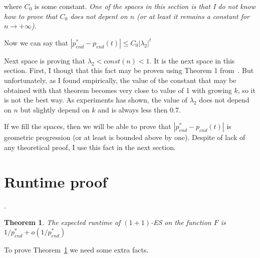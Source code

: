 \documentclass{article}
\newtheorem{theorem}{Theorem}
\begin{document}
where $C_0$ is some constant. \textit{One of the spaces in this section is that I do not know how to prove that $C_0$ does not depent on $n$ (or at least it remains a constant for $n \to +\infty$).}

Now we can say that $|p_{end}^* - p_{end}(t)| \le C_0 |\lambda_2|^t$

Next space is proving that $\lambda_2 < const(n) < 1.$ It is the next space in this section. First, I thougt that this fact may be proven using Theorem 1 from~\cite{secondev}. But unfortunately, as I found empirically, the value of the constant that may be obtained with that theorem becomes very close to value of 1 with growing $k$, so it is not the best way. As experiments has shown, the value of $\lambda_2$ does not depend on $n$ but slightly depend on $k$ and is always less then $0.7$.

If we fill the spaces, then we will be able to prove that  $|p_{end}^* - p_{end}(t)|$ is geometric progression (or at least is bounded above by one). Despite of lack of any theoretical proof, I use this fact in the next section.

\section{Runtime proof}.

\begin{theorem}\label{runtime_th}
  The expected runtime of $(1 + 1)$-ES on the function $F$ is $1 / p_{end}^* + o(1 / p_{end}^*)$
\end{theorem}

To prove Theorem~\ref{runtime_th} we need some extra facts.
\end{document}

